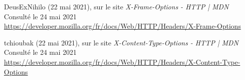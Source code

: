 \begin{thebibliography}{}
DeusExNihilo (22 mai 2021), sur le site \textit{X-Frame-Options - HTTP | MDN} Consulté le 24 mai 2021
\\\url{https://developer.mozilla.org/fr/docs/Web/HTTP/Headers/X-Frame-Options}

tchioubak (22 mai 2021), sur le site \textit{X-Content-Type-Options - HTTP | MDN} Consulté le 24 mai 2021
\\\url{https://developer.mozilla.org/fr/docs/Web/HTTP/Headers/X-Content-Type-Options}

\end{thebibliography}


